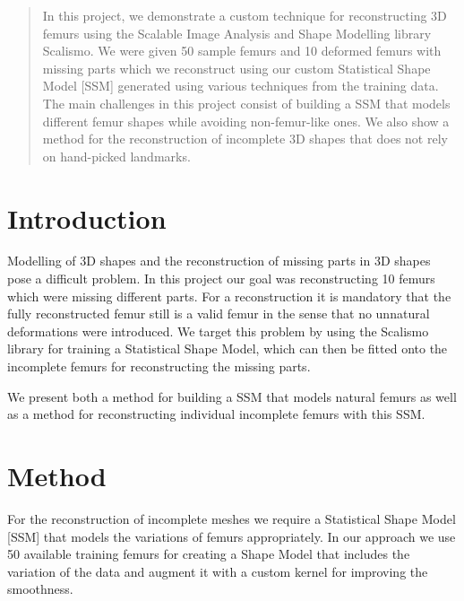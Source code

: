 \documentclass{article}
\begin{document}
	\begin{abstract}
		In this project, we demonstrate a custom technique for reconstructing 3D femurs using the Scalable Image Analysis and Shape Modelling library Scalismo. We were given 50 sample femurs and 10 deformed femurs with missing parts which we reconstruct using our custom Statistical Shape Model [SSM] generated using various techniques from the training data. The main challenges in this project consist of building a SSM that models different femur shapes while avoiding non-femur-like ones. We also show a method for the reconstruction of incomplete 3D shapes that does not rely on hand-picked landmarks. 
	\end{abstract}
	
	\section{Introduction}
	
	Modelling of 3D shapes and the reconstruction of missing parts in 3D shapes pose a difficult problem. In this project our goal was reconstructing 10 femurs which were missing different parts. For a reconstruction it is mandatory that the fully reconstructed femur still is a valid femur in the sense that no unnatural deformations were introduced. We target this problem by using the Scalismo library for training a Statistical Shape Model, which can then be fitted onto the incomplete femurs for reconstructing the missing parts.
	
	We present both a method for building a SSM that models natural femurs as well as a method for reconstructing individual incomplete femurs with this SSM.
	

	\section{Method}
	For the reconstruction of incomplete meshes we require a Statistical Shape Model [SSM] that models the variations of femurs appropriately. In our approach we use 50 available training femurs for creating a Shape Model that includes the variation of the data and augment it with a custom kernel for improving the smoothness.
	
\end{document}

